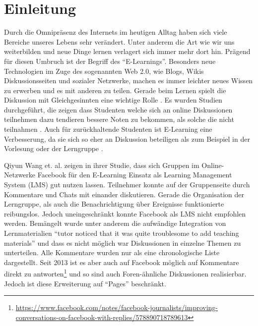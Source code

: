 
\chapter{Einleitung} %
\label{cha:einleitung}





Durch die Omnipräsenz des Internets im heutigen Alltag haben sich viele Bereiche unseres Lebens sehr verändert. Unter anderem die Art wie wir uns weiterbilden und neue Dinge lernen verlagert sich immer mehr dort hin. Prägend für diesen Umbruch ist der Begriff des \enquote{E-Learnings}. Besonders neue Technologien im Zuge des sogenannten Web 2.0, wie Blogs, Wikis Diskussionsseiten und sozialer Netzwerke, machen es immer leichter neues Wissen zu erwerben und es mit anderen zu teilen. Gerade beim Lernen spielt die Diskussion mit Gleichgesinnten eine wichtige Rolle \cite{Downes2005}. Es wurden Studien durchgeführt, die zeigen dass Studenten welche sich an online Diskussionen teilnehmen dazu tendieren bessere Noten zu bekommen, als solche die nicht teilnahmen \cite{Davies2005,BJET:BJET780}. Auch für zurückhaltende Studenten ist E-Learning eine Verbesserung, da sie sich so eher an Diskussion beteiligen als zum Beispiel in der Vorlesung oder der Lerngruppe \cite{Huang:2009:EPF:1516241.1516267}. 

Qiyun Wang et. al. \cite{Wang2012} zeigen in ihrer Studie, dass sich Gruppen im Online-Netzwerke Facebook für den E-Learning Einsatz als Learning Management System (LMS) gut nutzen lassen. Teilnehmer konnte auf der Gruppenseite durch Kommentare und Chats mit einander diskutieren. Gerade die Organisation der Lerngruppe, als auch die Benachrichtigung über Ereignisse funktionierte reibungslos. Jedoch uneingeschränkt konnte Facebook als LMS nicht empfohlen werden. Bemängelt wurde unter anderem die aufwändige Integration von Lernmaterialien \enquote{tutor noticed that it was quite troublesome to add teaching materials}\cite[S.\,435]{Wang2012} und dass es nicht möglich war Diskussionen in einzelne Themen zu unterteilen. Alle Kommentare wurden nur als eine chronologische Liste dargestellt. Seit 2013 ist es aber auch auf Facebook möglich auf Kommentare direkt zu antworten\footnote{\url{https://www.facebook.com/notes/facebook-journalists/improving-conversations-on-facebook-with-replies/578890718789613}} und so sind auch Foren-ähnliche Diskussionen realisierbar. Jedoch ist diese Erweiterung auf \enquote{Pages} beschränkt.

